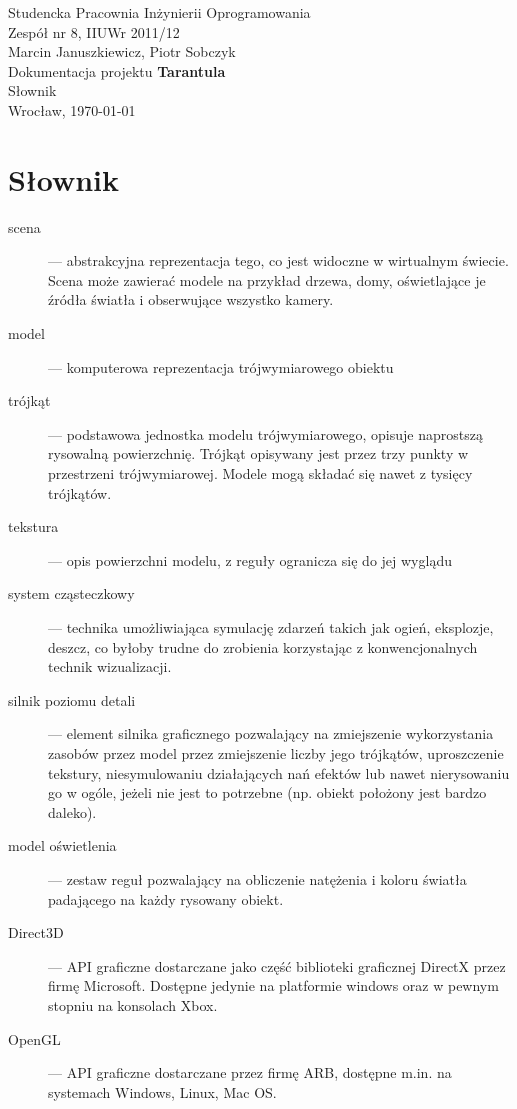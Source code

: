 \documentclass[11pt,leqno]{article}
\begin{document}
\begin{center}
\thispagestyle{empty}
{\Large Studencka Pracownia Inżynierii Oprogramowania}\\[0.5cm]
{\Large Zespół nr 8, IIUWr 2011/12}\\[2.5cm]

{\large Marcin Januszkiewicz, Piotr Sobczyk}\\[0.5cm]
{\huge Dokumentacja projektu \textbf{Tarantula}}\\[0.25cm]
{\huge Słownik}\\[0.5cm]
\vfill
{\large Wrocław, \today}
\end{center}

\newpage


\section{Słownik}
\begin{description}
 \item[scena] --- abstrakcyjna reprezentacja tego, co jest widoczne w wirtualnym świecie. Scena może zawierać modele na przykład drzewa, domy, oświetlające je źródła światła i obserwujące wszystko kamery.
 
 \item[model] --- komputerowa reprezentacja trójwymiarowego obiektu


\item[trójkąt] --- podstawowa jednostka modelu trójwymiarowego, opisuje naprostszą rysowalną powierzchnię. Trójkąt opisywany jest przez trzy punkty w przestrzeni trójwymiarowej. Modele mogą składać się nawet z tysięcy trójkątów.

\item[tekstura] --- opis powierzchni modelu, z reguły ogranicza się do jej wyglądu

\item[system cząsteczkowy] --- technika umożliwiająca symulację zdarzeń takich jak ogień, eksplozje, deszcz, co byłoby trudne do zrobienia korzystając z konwencjonalnych technik wizualizacji.

\item[silnik poziomu detali] --- element silnika graficznego pozwalający na zmiejszenie wykorzystania zasobów przez model przez zmiejszenie liczby jego trójkątów, uproszczenie tekstury, niesymulowaniu działających nań efektów lub nawet nierysowaniu go w ogóle, jeżeli nie jest to potrzebne (np. obiekt położony jest bardzo daleko).

\item[model oświetlenia] --- zestaw reguł pozwalający na obliczenie natężenia i koloru światła padającego na każdy rysowany obiekt.

\item[Direct3D] --- API graficzne dostarczane jako część biblioteki graficznej DirectX przez firmę Microsoft. Dostępne jedynie na platformie windows oraz w pewnym stopniu na konsolach Xbox.

\item[OpenGL] --- API graficzne dostarczane przez firmę ARB, dostępne m.in. na systemach Windows, Linux, Mac OS.
 \end{description}
\end{document}
